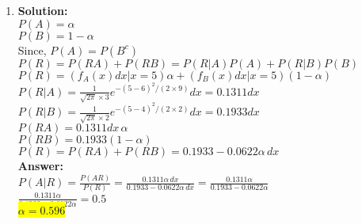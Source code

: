 \documentclass{article}
\newcommand{\myansw}{\textbf{Answer:}\\}
\newcommand{\mysolu}{\textbf{Solution:}\\}
\begin{document}
\begin{enumerate}
\begin{enumerate}
	\end{enumerate}
	\item 
	\mysolu
	${P(A) = \alpha}$\\
	${P(B) = 1-\alpha}$\\
	Since, ${P(A) = P(B^c)}$\\
	${P(R) = P(RA)+P(RB)=P(R|A)P(A)+P(R|B)P(B)}$\\
	${P(R) = (f_A(x)dx|x = 5)\alpha + (f_B(x)dx|x = 5)(1-\alpha)}$\\
	${P(R|A) = \frac{1}{\sqrt{2\pi}\times3}e^{-(5-6)^2/(2\times 9)} dx = 0.1311 dx}$\\
	${P(R|B) = \frac{1}{\sqrt{2\pi}\times2}e^{-(5-4)^2/(2\times 2)} dx = 0.1933 dx}$\\
	${P(RA) = 0.1311 dx \, \alpha}$\\
	${P(RB) = 0.1933 (1 - \alpha)}$\\
	${P(R) = P(RA)+P(RB) = 0.1933 - 0.0622 \alpha \, dx}$\\
	\myansw
	${P(A|R) = \frac{P(AR)}{P(R)}=\frac{0.1311 \alpha \,dx }{0.1933 - 0.0622  \alpha \, dx}=\frac{0.1311 \alpha  }{0.1933 - 0.0622 \alpha}}$\\
	${\frac{ 0.1311 \alpha  }{0.1933 - 0.0622 \alpha}=0.5}$\\
	\colorbox{yellow}{
		${\alpha = 0.596}$
	}\\


\end{enumerate}
\end{document}
